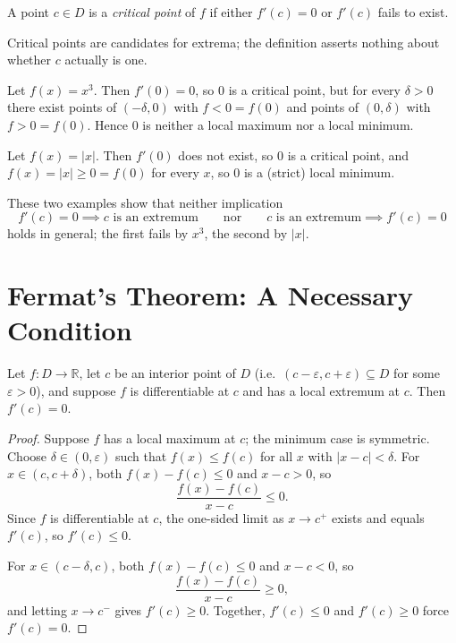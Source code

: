 \documentclass{essay}
\begin{document}
\begin{definition}
A point \(c\in D\) is a \emph{critical point} of \(f\) if either \(f'(c)=0\)
or \(f'(c)\) fails to exist.
\end{definition}

Critical points are candidates for extrema; the definition asserts nothing
about whether \(c\) actually is one.

\begin{example}
Let \(f(x)=x^3\). Then \(f'(0)=0\), so \(0\) is a critical point, but for
every \(\delta>0\) there exist points of \((-\delta,0)\) with \(f<0=f(0)\)
and points of \((0,\delta)\) with \(f>0=f(0)\). Hence \(0\) is neither a
local maximum nor a local minimum.
\end{example}

\begin{example}
Let \(f(x)=|x|\). Then \(f'(0)\) does not exist, so \(0\) is a critical
point, and \(f(x)=|x|\geq 0=f(0)\) for every \(x\), so \(0\) is a (strict)
local minimum.
\end{example}

These two examples show that neither implication
\[
f'(c)=0 \implies c \text{ is an extremum}
\qquad\text{nor}\qquad
c \text{ is an extremum} \implies f'(c)=0
\]
holds in general; the first fails by \(x^3\), the second by \(|x|\).

\section{Fermat's Theorem: A Necessary Condition}

\begin{theorem}[Fermat]
Let \(f:D\to\mathbb{R}\), let \(c\) be an interior point of \(D\) (i.e.\
\((c-\varepsilon,c+\varepsilon)\subseteq D\) for some \(\varepsilon>0\)),
and suppose \(f\) is differentiable at \(c\) and has a local extremum at
\(c\). Then \(f'(c)=0\).
\end{theorem}

\begin{proof}
Suppose \(f\) has a local maximum at \(c\); the minimum case is symmetric.
Choose \(\delta\in(0,\varepsilon)\) such that \(f(x)\leq f(c)\) for all
\(x\) with \(|x-c|<\delta\). For \(x\in(c,c+\delta)\), both \(f(x)-f(c)\leq
0\) and \(x-c>0\), so
\[
\frac{f(x)-f(c)}{x-c}\leq 0.
\]
Since \(f\) is differentiable at \(c\), the one-sided limit as \(x\to
c^+\) exists and equals \(f'(c)\), so \(f'(c)\leq 0\).

For \(x\in(c-\delta,c)\), both \(f(x)-f(c)\leq0\) and \(x-c<0\), so
\[
\frac{f(x)-f(c)}{x-c}\geq 0,
\]
and letting \(x\to c^-\) gives \(f'(c)\geq 0\). Together, \(f'(c)\leq 0\)
and \(f'(c)\geq 0\) force \(f'(c)=0\).
\end{proof}
\end{document}
